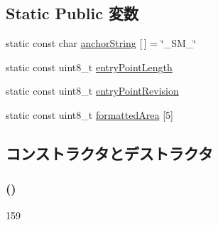 \subsection*{Static Public 変数}
\begin{DoxyCompactItemize}
\item 
static const char \hyperlink{structX86ISA_1_1SMBios_1_1SMBiosTable_1_1SMBiosHeader_a0501813ea6f7cf8facdfd1295aa31024}{anchorString} \mbox{[}$\,$\mbox{]} = \char`\"{}\_\-SM\_\-\char`\"{}
\item 
static const uint8\_\-t \hyperlink{structX86ISA_1_1SMBios_1_1SMBiosTable_1_1SMBiosHeader_a8f22a47e68c807a4fac29b6200318347}{entryPointLength}
\item 
static const uint8\_\-t \hyperlink{structX86ISA_1_1SMBios_1_1SMBiosTable_1_1SMBiosHeader_a5dbafc702d842d0e0d8a1566a19d8c51}{entryPointRevision}
\item 
static const uint8\_\-t \hyperlink{structX86ISA_1_1SMBios_1_1SMBiosTable_1_1SMBiosHeader_a091d93ca428b67eea1367ee9822c0d4d}{formattedArea} \mbox{[}5\mbox{]}
\end{DoxyCompactItemize}


\subsection{コンストラクタとデストラクタ}
\hypertarget{structX86ISA_1_1SMBios_1_1SMBiosTable_1_1SMBiosHeader_a694cbbfa020d34c90023d262e4e736d1}{
\subsubsection[{SMBiosHeader}]{ ()}}
\label{structX86ISA_1_1SMBios_1_1SMBiosTable_1_1SMBiosHeader_a694cbbfa020d34c90023d262e4e736d1}



\begin{DoxyCode}
159         {}
\end{DoxyCode}


